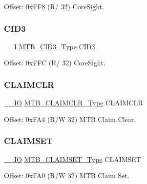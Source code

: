 Offset\+: 0x\+F\+F8 (R/ 32) Core\+Sight. 

\mbox{\label{struct_mtb_ac349d20d31185847fcf8a42f5a6eee0a}} 
\subsubsection{\texorpdfstring{CID3}{CID3}}
{\footnotesize\ttfamily \mbox{\hyperlink{core__cm0plus_8h_af63697ed9952cc71e1225efe205f6cd3}{\+\_\+\+\_\+I}} \mbox{\hyperlink{union_m_t_b___c_i_d3___type}{M\+T\+B\+\_\+\+C\+I\+D3\+\_\+\+Type}} C\+I\+D3}



Offset\+: 0x\+F\+FC (R/ 32) Core\+Sight. 

\mbox{\label{struct_mtb_a754151aa0b1892bb619338aa4144411c}} 
\subsubsection{\texorpdfstring{CLAIMCLR}{CLAIMCLR}}
{\footnotesize\ttfamily \mbox{\hyperlink{core__cm0plus_8h_aec43007d9998a0a0e01faede4133d6be}{\+\_\+\+\_\+\+IO}} \mbox{\hyperlink{union_m_t_b___c_l_a_i_m_c_l_r___type}{M\+T\+B\+\_\+\+C\+L\+A\+I\+M\+C\+L\+R\+\_\+\+Type}} C\+L\+A\+I\+M\+C\+LR}



Offset\+: 0x\+F\+A4 (R/W 32) M\+TB Claim Clear. 

\mbox{\label{struct_mtb_ade6fdf33852d4eea3792e2eb37d29f87}} 
\subsubsection{\texorpdfstring{CLAIMSET}{CLAIMSET}}
{\footnotesize\ttfamily \mbox{\hyperlink{core__cm0plus_8h_aec43007d9998a0a0e01faede4133d6be}{\+\_\+\+\_\+\+IO}} \mbox{\hyperlink{union_m_t_b___c_l_a_i_m_s_e_t___type}{M\+T\+B\+\_\+\+C\+L\+A\+I\+M\+S\+E\+T\+\_\+\+Type}} C\+L\+A\+I\+M\+S\+ET}



Offset\+: 0x\+F\+A0 (R/W 32) M\+TB Claim Set. 

\mbox{\label{struct_mtb_ad915ff99052a4a66c854be316bb4b02d}} 
